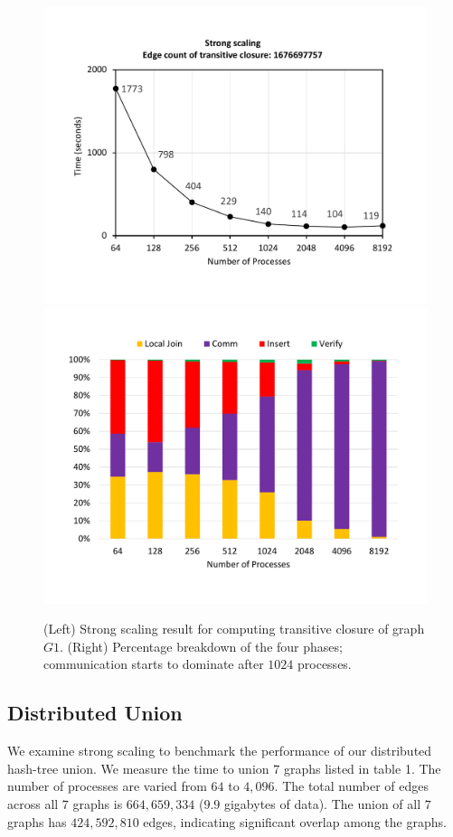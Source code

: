 \begin{figure}[t]
	{\includegraphics[width=.50\textwidth,  trim={0cm 0cm 0cm 0cm, 
			clip}]{results/TC_1_final.pdf}}\hfill%
	{\includegraphics[width=.50\textwidth,  trim={0cm 0cm 0cm 0cm,
			clip}]{results/TC_1_break_down_final.pdf}}\hfill%
	\centering
	\caption{(Left) Strong scaling result for computing transitive closure of graph $G1$. (Right) Percentage breakdown of the four phases; communication starts to dominate after $1024$ processes. }
	\label{fig:tc_small}
\end{figure}



\subsection{Distributed Union}
\label{sec:union}


We examine strong scaling to benchmark the performance of our distributed hash-tree union. We measure the time to union $7$ graphs listed in table 1. The number of processes are varied from $64$ to $4,\!096$. The total number of edges across all $7$ graphs is $664,\!659,\!334$ ($9.9$ gigabytes of data). The union of all $7$ graphs has $424,\!592,\!810$ edges, indicating significant overlap among the graphs.

